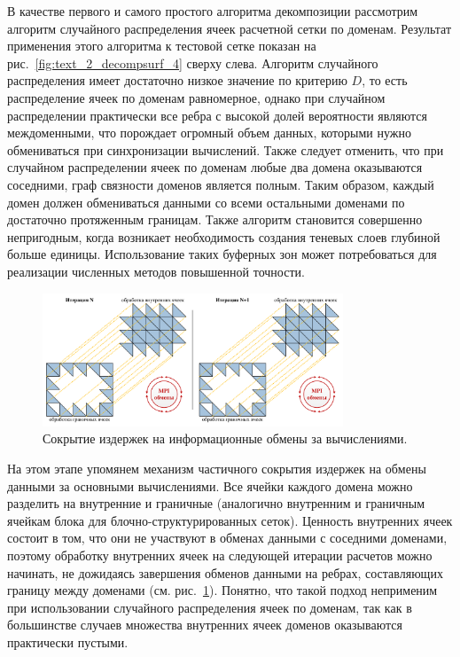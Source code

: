 В качестве первого и самого простого алгоритма декомпозиции рассмотрим алгоритм случайного распределения\label{term:alg_decomp_random} ячеек расчетной сетки по доменам.
Результат применения этого алгоритма к тестовой сетке показан на рис.~\ref{fig:text_2_decompsurf_4} сверху слева.
Алгоритм случайного распределения имеет достаточно низкое значение по критерию $D$\label{term:decomp_neravn3}, то есть распределение ячеек по доменам равномерное, однако при случайном распределении практически все ребра с высокой долей вероятности являются междоменными\label{term:edge_cross2}, что порождает огромный объем данных, которыми нужно обмениваться при синхронизации вычислений.
Также следует отменить, что при случайном распределении ячеек по доменам любые два домена\label{term:domain2} оказываются соседними, граф связности доменов является полным.
Таким образом, каждый домен должен обмениваться данными со всеми остальными доменами по достаточно протяженным границам.
Также алгоритм становится совершенно непригодным, когда возникает необходимость создания теневых слоев\label{term:block_shadow_layer2} глубиной больше единицы.
Использование таких буферных зон может потребоваться для реализации численных методов повышенной точности.

\begin{figure}[ht]
\centering
\includegraphics[width=0.8\textwidth]{./pics/text_2_decompsurf/mpi_border_inner.pdf}
\singlespacing
{}\caption{Сокрытие издержек на информационные обмены за вычислениями.}
\label{fig:text_2_decompsurf_wing_border_inner}
\end{figure}

На этом этапе упомянем механизм частичного сокрытия издержек на обмены данными за основными вычислениями.
Все ячейки каждого домена можно разделить на внутренние\label{term:cell_block_inner2} и граничные\label{term:cell_block_border2} (аналогично внутренним и граничным ячейкам блока для блочно-структурированных сеток).
Ценность внутренних ячеек состоит в том, что они не участвуют в обменах данными с соседними доменами, поэтому обработку внутренних ячеек на следующей итерации расчетов можно начинать, не дожидаясь завершения обменов данными на ребрах, составляющих границу между доменами (см. рис.~\ref{fig:text_2_decompsurf_wing_border_inner}).
Понятно, что такой подход неприменим при использовании случайного распределения ячеек по доменам, так как в большинстве случаев множества внутренних ячеек доменов оказываются практически пустыми.

